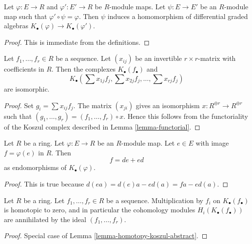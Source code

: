 \begin{lemma}
\label{lemma-functorial}
Let $\varphi : E \to R$ and $\varphi' : E' \to R$ be $R$-module maps.
Let $\psi : E \to E'$ be an $R$-module map such that
$\varphi' \circ \psi = \varphi$. Then $\psi$ induces a
homomorphism of differential graded algebras
$K_\bullet(\varphi) \to K_\bullet(\varphi')$.
\end{lemma}

\begin{proof}
This is immediate from the definitions.
\end{proof}

\begin{lemma}
\label{lemma-change-basis}
Let $f_1, \ldots, f_r \in R$ be a sequence.
Let $(x_{ij})$ be an invertible $r \times r$-matrix with
coefficients in $R$. Then the complexes
$K_\bullet(f_\bullet)$ and
$$
K_\bullet(\sum x_{1j}f_j, \sum x_{2j}f_j, \ldots, \sum x_{rj}f_j)
$$
are isomorphic.
\end{lemma}

\begin{proof}
Set $g_i = \sum x_{ij}f_j$.
The matrix $(x_{ji})$ gives an isomorphism $x : R^{\oplus r} \to R^{\oplus r}$
such that $(g_1, \ldots, g_r) = (f_1, \ldots, f_r) \circ x$.
Hence this follows from the functoriality of the Koszul complex
described in
Lemma \ref{lemma-functorial}.
\end{proof}

\begin{lemma}
\label{lemma-homotopy-koszul-abstract}
Let $R$ be a ring. Let $\varphi : E \to R$ be an $R$-module map.
Let $e \in E$ with image $f = \varphi(e)$ in $R$. Then
$$
f = de + ed
$$
as endomorphisms of $K_\bullet(\varphi)$.
\end{lemma}

\begin{proof}
This is true because $d(ea) = d(e)a - ed(a) = fa - ed(a)$.
\end{proof}

\begin{lemma}
\label{lemma-homotopy-koszul}
Let $R$ be a ring. Let $f_1, \ldots, f_r \in R$ be a sequence.
Multiplication by $f_i$ on $K_\bullet(f_\bullet)$ is homotopic to
zero, and in particular the cohomology modules $H_i(K_\bullet(f_\bullet))$
are annihilated by the ideal $(f_1, \ldots, f_r)$.
\end{lemma}

\begin{proof}
Special case of
Lemma \ref{lemma-homotopy-koszul-abstract}.
\end{proof}

